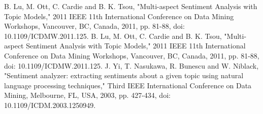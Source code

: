 \documentclass[conference]{IEEEtran}
\begin{document}
\begin{thebibliography}{00}
 B. Lu, M. Ott, C. Cardie and B. K. Tsou, "Multi-aspect Sentiment Analysis with Topic Models," 2011 IEEE 11th International Conference on Data Mining Workshops, Vancouver, BC, Canada, 2011, pp. 81-88, doi: 10.1109/ICDMW.2011.125.
 B. Lu, M. Ott, C. Cardie and B. K. Tsou, "Multi-aspect Sentiment Analysis with Topic Models," 2011 IEEE 11th International Conference on Data Mining Workshops, Vancouver, BC, Canada, 2011, pp. 81-88, doi: 10.1109/ICDMW.2011.125.
 J. Yi, T. Nasukawa, R. Bunescu and W. Niblack, "Sentiment analyzer: extracting sentiments about a given topic using natural language processing techniques," Third IEEE International Conference on Data Mining, Melbourne, FL, USA, 2003, pp. 427-434, doi: 10.1109/ICDM.2003.1250949.
\end{thebibliography}
\end{document}
